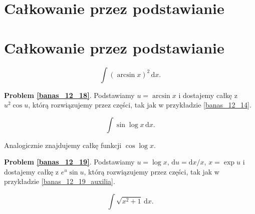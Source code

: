 \section{Całkowanie przez podstawianie}
\section{Całkowanie przez podstawianie}

\begin{problem_with_solution}
    \label{banas_12_18}%
    \begin{equation}
        \int (\arcsin x)^2 \,\mathrm{d}x.
    \end{equation}
\end{problem_with_solution}

\textbf{Problem \ref{banas_12_18}}.
Podstawiamy $u = \arcsin x$ i dostajemy całkę z $u^2 \cos u$, którą rozwiązujemy przez części, tak jak w przykładzie \ref{banas_12_14}.

\begin{problem_with_solution}
    \label{banas_12_19}%
    \begin{equation}
        \int \sin \log x \, \mathrm{d}x.
    \end{equation}
\end{problem_with_solution}

Analogicznie znajdujemy całkę funkcji $\cos \log x$.

\textbf{Problem \ref{banas_12_19}}.
Podstawiamy $u = \log x$, $\mathrm{d} u = \mathrm{d} x / x$, $x = \exp u$ i dostajemy całkę z $e^u \sin u$, którą rozwiązujemy przez części, tak jak w przykładzie \ref{banas_12_19_auxilia}.


\begin{problem_with_solution}
    \label{banas_12_21}%
    \begin{equation}
        \int \sqrt{x^2 + 1} \, \mathrm{d}x.
    \end{equation}
\end{problem_with_solution}

